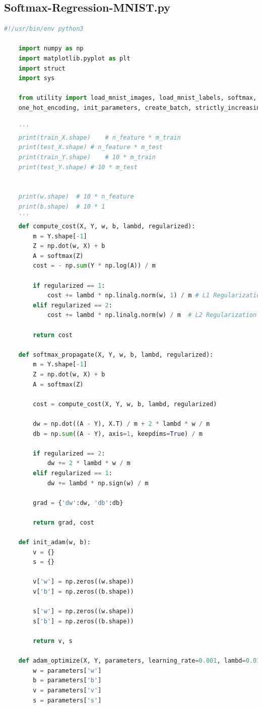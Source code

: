 \documentclass{article}
\begin{document}
\subsection{Softmax-Regression-MNIST.py}
\begin{lstlisting}[language=Python, breaklines]
	#!/usr/bin/env python3
	
	import numpy as np
	import matplotlib.pyplot as plt
	import struct
	import sys
	
	from utility import load_mnist_images, load_mnist_labels, softmax, \
	one_hot_encoding, init_parameters, create_batch, strictly_increasing
	
	'''
	print(train_X.shape)    # n_feature * m_train
	print(test_X.shape) # n_feature * m_test
	print(train_Y.shape)    # 10 * m_train
	print(test_Y.shape) # 10 * m_test
	
	
	print(w.shape)  # 10 * n_feature
	print(b.shape)  # 10 * 1
	'''
	def compute_cost(X, Y, w, b, lambd, regularized):
	    m = Y.shape[-1]
	    Z = np.dot(w, X) + b
	    A = softmax(Z)
	    cost = - np.sum(Y * np.log(A)) / m
	
	    if regularized == 1:
	        cost += lambd * np.linalg.norm(w, 1) / m # L1 Regularization
	    elif regularized == 2:
	        cost += lambd * np.linalg.norm(w) / m  # L2 Regularization
	
	    return cost
	
	def softmax_propagate(X, Y, w, b, lambd, regularized):
	    m = Y.shape[-1]
	    Z = np.dot(w, X) + b
	    A = softmax(Z)
	
	    cost = compute_cost(X, Y, w, b, lambd, regularized)
	
	    dw = np.dot((A - Y), X.T) / m + 2 * lambd * w / m
	    db = np.sum((A - Y), axis=1, keepdims=True) / m
	
	    if regularized == 2:
	        dw += 2 * lambd * w / m
	    elif regularized == 1:
	        dw += lambd * np.sign(w) / m
	
	    grad = {'dw':dw, 'db':db}
	
	    return grad, cost
	
	def init_adam(w, b):
	    v = {}
	    s = {}
	
	    v['w'] = np.zeros((w.shape))
	    v['b'] = np.zeros((b.shape))
	
	    s['w'] = np.zeros((w.shape))
	    s['b'] = np.zeros((b.shape))
	
	    return v, s
	
	def adam_optimize(X, Y, parameters, learning_rate=0.001, lambd=0.01, beta1=0.9, beta2=0.999, epsilon=10**(-8), regularized=2):
	    w = parameters['w']
	    b = parameters['b']
	    v = parameters['v']
	    s = parameters['s']
	

\end{lstlisting}
\end{document}
